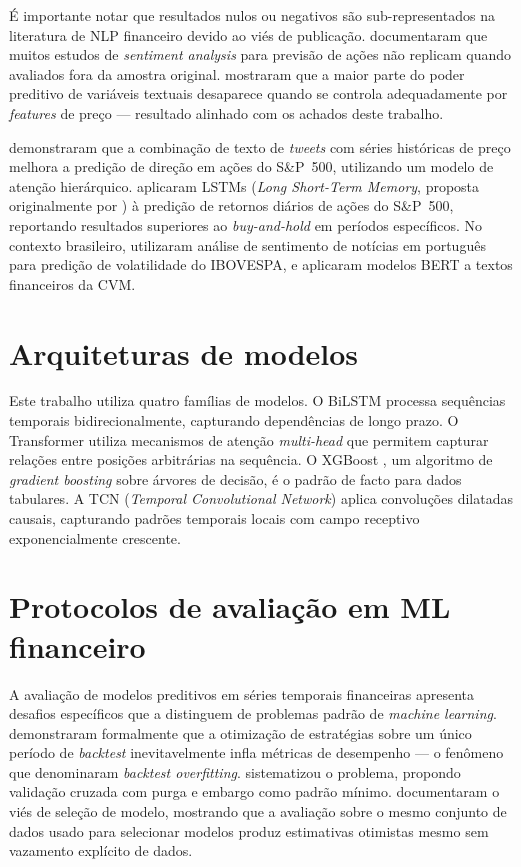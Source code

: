 \documentclass[
    12pt,
    openright,
    oneside,
    a4paper,
    english,
    brazil
]{abntex2}
\begin{document}
É importante notar que resultados nulos ou negativos são sub-representados na literatura de NLP financeiro devido ao viés de publicação.  documentaram que muitos estudos de \textit{sentiment analysis} para previsão de ações não replicam quando avaliados fora da amostra original.  mostraram que a maior parte do poder preditivo de variáveis textuais desaparece quando se controla adequadamente por \textit{features} de preço --- resultado alinhado com os achados deste trabalho.

 demonstraram que a combinação de texto de \textit{tweets} com séries históricas de preço melhora a predição de direção em ações do S\&P~500, utilizando um modelo de atenção hierárquico.  aplicaram LSTMs (\textit{Long Short-Term Memory}, proposta originalmente por ) à predição de retornos diários de ações do S\&P~500, reportando resultados superiores ao \textit{buy-and-hold} em períodos específicos. No contexto brasileiro,  utilizaram análise de sentimento de notícias em português para predição de volatilidade do IBOVESPA, e  aplicaram modelos BERT a textos financeiros da CVM.

\section{Arquiteturas de modelos}

Este trabalho utiliza quatro famílias de modelos. O BiLSTM \cite{hochreiter1997} processa sequências temporais bidirecionalmente, capturando dependências de longo prazo. O Transformer \cite{vaswani2017} utiliza mecanismos de atenção \textit{multi-head} que permitem capturar relações entre posições arbitrárias na sequência. O XGBoost \cite{chen2016}, um algoritmo de \textit{gradient boosting} sobre árvores de decisão, é o padrão de facto para dados tabulares. A TCN (\textit{Temporal Convolutional Network}) \cite{bai2018} aplica convoluções dilatadas causais, capturando padrões temporais locais com campo receptivo exponencialmente crescente.

\section{Protocolos de avaliação em ML financeiro}

A avaliação de modelos preditivos em séries temporais financeiras apresenta desafios específicos que a distinguem de problemas padrão de \textit{machine learning}.  demonstraram formalmente que a otimização de estratégias sobre um único período de \textit{backtest} inevitavelmente infla métricas de desempenho --- o fenômeno que denominaram \textit{backtest overfitting}.  sistematizou o problema, propondo validação cruzada com purga e embargo como padrão mínimo.  documentaram o viés de seleção de modelo, mostrando que a avaliação sobre o mesmo conjunto de dados usado para selecionar modelos produz estimativas otimistas mesmo sem vazamento explícito de dados.
\end{document}
